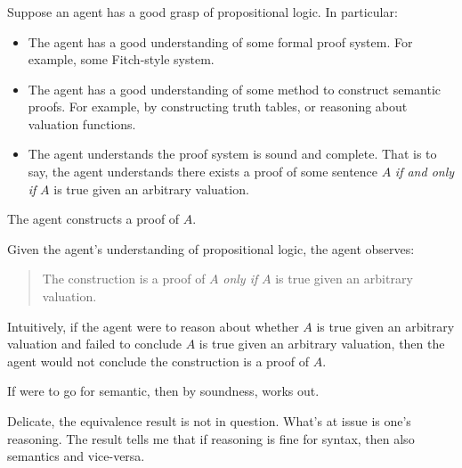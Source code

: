 \subsubsection{}

\begin{note}
  \begin{scenario}
    \label{illu:sketch:prop-logic}
    Suppose an agent has a good grasp of propositional logic.
    In particular:
    \begin{itemize}
    \item
      The agent has a good understanding of some formal proof system.
      For example, some Fitch-style system.
    \item
      The agent has a good understanding of some method to construct semantic proofs.
      For example, by constructing truth tables, or reasoning about valuation functions.
    \item
      The agent understands the proof system is sound and complete.
      That is to say, the agent understands there exists a proof of some sentence \(A\) \emph{if and only if} \(A\) is true given an arbitrary valuation.
    \end{itemize}
    The agent constructs a proof of \(A\).

    Given the agent's understanding of propositional logic, the agent observes:
    \begin{quote}
      The construction is a proof of \(A\) \emph{only if} \(A\) is true given an arbitrary valuation.
    \end{quote}
  \end{scenario}

  Intuitively, if the agent were to reason about whether \(A\) is true given an arbitrary valuation and failed to conclude \(A\) is true given an arbitrary valuation, then the agent would not conclude the construction is a proof of \(A\).

  If were to go for semantic, then by soundness, works out.
\end{note}

\begin{note}[Interest]
  Delicate, the equivalence result is not in question.
  What's at issue is one's reasoning.
  The result tells me that if reasoning is fine for syntax, then also semantics and vice-versa.
\end{note}

